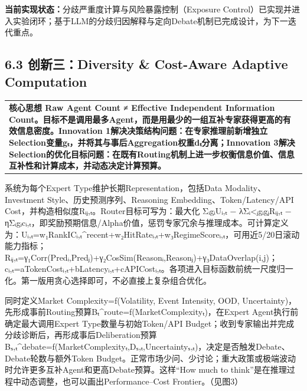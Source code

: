 \documentclass[12pt,a4paper]{ctexart}
\begin{document}
\textbf{当前实现状态：}分歧严重度计算与风险暴露控制（Exposure
Control）已实现并进入实验闭环；基于LLM的分歧归因解释与定向Debate机制已完成设计，为下一迭代重点。

\subsection{\texorpdfstring{\textbf{6.3 创新三：Diversity \& Cost-Aware
Adaptive
Computation}}{6.3 创新三：Diversity \& Cost-Aware Adaptive Computation}}\label{ux521bux65b0ux4e09diversity-cost-aware-adaptive-computation}

\begin{longtable}[]{@{}
  >{\raggedright\arraybackslash}p{}@{}}
\toprule\noalign{}
\endhead
\bottomrule\noalign{}
\endlastfoot
\textbf{核心思想 Raw Agent Count ≠ Effective Independent Information
Count。目标不是调用最多Agent，而是用最少的一组互补专家获得更高的有效信息密度。Innovation
1解决决策结构问题：在专家推理前新增独立Selection变量gₜ，并将其与事后Aggregation权重dₜ分离；Innovation
3解决Selection的优化目标问题：在既有Routing机制上进一步权衡信息价值、信息互补性和计算成本，并动态决定计算预算。} \\
\end{longtable}

系统为每个Expert Type维护长期Representation，包括Data
Modality、Investment Style、历史预测序列、Reasoning
Embedding、Token/Latency/API
Cost，并构造相似度Rᵢⱼ,ₜ。Router目标可写为：最大化 ΣᵢgᵢUᵢ,ₜ −
λΣᵢ\textless ⱼgᵢgⱼRᵢⱼ,ₜ −
ηΣᵢgᵢcᵢ,ₜ，即奖励预期信息/Alpha价值，惩罚专家冗余与推理成本。可计算定义为：Uᵢ,ₜ=w₁RankICᵢ,ₜ\^{}recent+w₂HitRateᵢ,ₜ+w₃RegimeScoreᵢ,ₜ，可用近5/20日滚动能力指标；Rᵢⱼ,ₜ=γ₁Corr(Predᵢ,Predⱼ)+γ₂CosSim(Reasonᵢ,Reasonⱼ)+γ₃DataOverlap(i,j)；cᵢ,ₜ=aTokenCostᵢ,ₜ+bLatencyᵢ,ₜ+cAPICostᵢ,ₜ。各项进入目标函数前统一尺度归一化。第一版用贪心选择即可，不必直接上复杂组合优化。

同时定义Market Complexity=f(Volatility, Event Intensity, OOD,
Uncertainty)，先形成事前Routing预算Bₜ\^{}route=f(MarketComplexityₜ)，在Expert
Agent执行前确定最大调用Expert Type数量与初始Token/API
Budget；收到专家输出并完成分歧诊断后，再形成事后Deliberation预算Bₛ,ₜ\^{}debate=f(MarketComplexityₜ,Dₛ,ₜ,Uncertaintyₛ,ₜ)，决定是否触发Debate、Debate轮数与额外Token
Budget。正常市场少问、少讨论；重大政策或极端波动时允许更多互补Agent和更高Debate预算。这样``How
much to think''是在推理过程中动态调整，也可以画出Performance--Cost
Frontier。（见图3）
\end{document}
